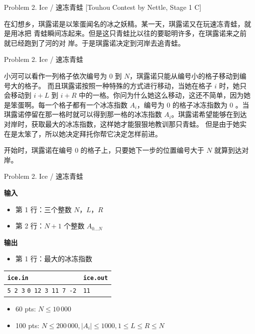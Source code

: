 \documentclass[UTF8]{beamer}
\begin{document}

\begin{frame}{Problem 2. Ice / 速冻青蛙}
[Touhou Contest by Nettle, Stage 1 C]

在幻想乡，琪露诺是以笨蛋闻名的冰之妖精。某一天，琪露诺又在玩速冻青蛙，就是用冰把
青蛙瞬间冻起来。但是这只青蛙比以往的要聪明许多，在琪露诺来之前就已经跑到了河的对
岸。于是琪露诺决定到河岸去追青蛙。

\end{frame}

\begin{frame}{Problem 2. Ice / 速冻青蛙}

小河可以看作一列格子依次编号为 0 到 $N$，琪露诺只能从编号小的格子移动到编号大的格子。
而且琪露诺按照一种特殊的方式进行移动，当她在格子 $i$ 时，她只会移动到 $i+L$ 到 $i+R$
中的一格。你问为什么她这么移动，这还不简单，因为她是笨蛋啊。每一个格子都有一个冰冻指数
$A_i$，编号为 0 的格子冰冻指数为 0 。当琪露诺停留在那一格时就可以得到那一格的冰冻指数
$A_i$。琪露诺希望能够在到达对岸时，获取最大的冰冻指数，这样她才能狠狠地教训那只青蛙。
但是由于她实在是太笨了，所以她决定拜托你帮它决定怎样前进。

开始时，琪露诺在编号 0 的格子上，只要她下一步的位置编号大于 $N$ 就算到达对岸。

\end{frame}

\begin{frame}{Problem 2. Ice / 速冻青蛙}

\textbf{输入}
\begin{itemize}
    \item 第 1 行：三个整数 $N$，$L$，$R$
    \item 第 2 行：$N+1$ 个整数 $A_{0 \dots N}$
\end{itemize}
\textbf{输出}
\begin{itemize}
    \item 第 1 行：最大的冰冻指数
\end{itemize}

\begin{tabularx}{\textwidth}{|X|X|}
\hline
\texttt{\textbf{ice.in}} & \texttt{\textbf{ice.out}} \\ \hline
\texttt{5 2 3}\newline
\texttt{0 12 3 11 7 -2}
&
\texttt{11}
\\ \hline
\end{tabularx}
\newline
\begin{itemize}
    \item 60 pts: $N \leq 10\,000$
    \item 100 pts: $N \leq 200\,000, |A_i| \leq 1000, 1 \leq L \leq R \leq N$
\end{itemize}

\end{frame}
\end{document}
